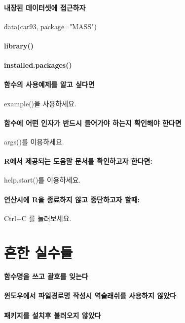 \paragraph{내장된 데이터셋에 접근하자} data(car93, package="MASS")
\paragraph{library()}
\paragraph{installed.packages()}
\paragraph{}
\paragraph{}
\paragraph{함수의 사용예제를 알고 싶다면 } example()을 사용하세요. 
\paragraph{함수에 어떤 인자가 반드시 들어가야 하는지 확인해야 한다면}  args()를 이용하세요.
\paragraph{R에서 제공되는 도움말 문서를 확인하고자 한다면:} help.start()를 이용하세요.
\paragraph{연산시에 R을 종료하지 않고 중단하고자 할때:}  Ctrl+C 를 눌러보세요.

\section{흔한 실수들}
\paragraph{함수명을 쓰고 괄호를 잊는다}

\paragraph{윈도우에서 파일경로명 작성시 역슬래쉬를 사용하지 않았다}

\paragraph{패키지를 설치후 불러오지 않았다}
